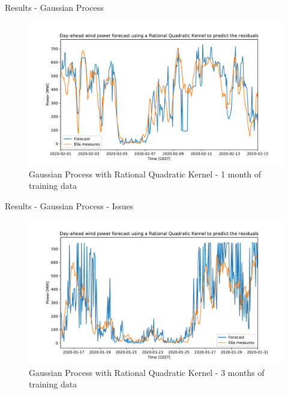 \documentclass[12pt]{beamer}
\begin{document}
\begin{frame}{Results - Gaussian Process}
    \begin{figure}
        \centering
        \includegraphics[width=\textwidth]{resources/pdf/dawpf_rqk_r_2a.pdf}
        \caption{Gaussian Process with Rational Quadratic Kernel - 1 month of training data}
    \end{figure}
\end{frame}

\begin{frame}{Results - Gaussian Process - Issues}
    \begin{figure}
        \centering
        \includegraphics[width=\textwidth]{resources/pdf/3,5_months_residuals.pdf}
        \caption{Gaussian Process with Rational Quadratic Kernel - 3 months of training data}
    \end{figure}
\end{frame}
\end{document}
